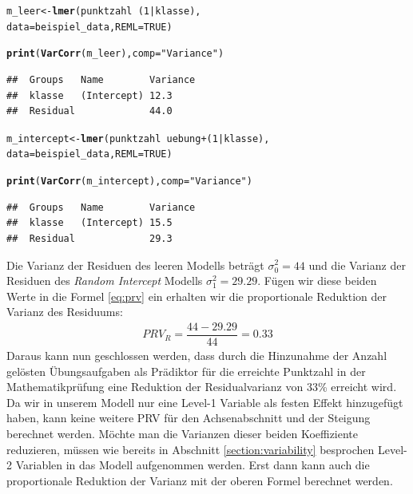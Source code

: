 \documentclass[12pt]{article}\usepackage[]{graphicx}\usepackage[]{color}
\makeatletter
\newcommand{\hlnum}[1]{\textcolor[rgb]{0.686,0.059,0.569}{#1}}%
\newcommand{\hlstr}[1]{\textcolor[rgb]{0.192,0.494,0.8}{#1}}%
\newcommand{\hlopt}[1]{\textcolor[rgb]{0,0,0}{#1}}%
\newcommand{\hlstd}[1]{\textcolor[rgb]{0.345,0.345,0.345}{#1}}%
\newcommand{\hlkwb}[1]{\textcolor[rgb]{0.69,0.353,0.396}{#1}}%
\newcommand{\hlkwc}[1]{\textcolor[rgb]{0.333,0.667,0.333}{#1}}%
\newcommand{\hlkwd}[1]{\textcolor[rgb]{0.737,0.353,0.396}{\textbf{#1}}}%
\newenvironment{kframe}{%
 \def\at@end@of@kframe{}%
 \ifinner\ifhmode%
  \def\at@end@of@kframe{\end{minipage}}%
  \begin{minipage}{\columnwidth}%
 \fi\fi%
 \def\FrameCommand##1{\hskip\@totalleftmargin \hskip-\fboxsep
 \colorbox{shadecolor}{##1}\hskip-\fboxsep
     \hskip-\linewidth \hskip-\@totalleftmargin \hskip\columnwidth}%
 \MakeFramed {\advance\hsize-\width
   \@totalleftmargin\z@ \linewidth\hsize
   \@setminipage}}%
 {\par\unskip\endMakeFramed%
 \at@end@of@kframe}
\newenvironment{knitrout}{}{} %
\makeatother
\begin{document}
\singlespacing
\begin{knitrout}
\color{fgcolor}\begin{kframe}
\begin{alltt}
\hlstd{m_leer} \hlkwb{<-} \hlkwd{lmer}\hlstd{(punktzahl} \hlopt{~} \hlstd{(}\hlnum{1} \hlopt{|} \hlstd{klasse),}
                \hlkwc{data} \hlstd{= beispiel_data,} \hlkwc{REML} \hlstd{=} \hlnum{TRUE}\hlstd{)}

\hlkwd{print}\hlstd{(}\hlkwd{VarCorr}\hlstd{(m_leer),} \hlkwc{comp} \hlstd{=} \hlstr{"Variance"}\hlstd{)}
\end{alltt}
\begin{verbatim}
##  Groups   Name        Variance
##  klasse   (Intercept) 12.3    
##  Residual             44.0
\end{verbatim}
\begin{alltt}
\hlstd{m_intercept} \hlkwb{<-} \hlkwd{lmer}\hlstd{(punktzahl} \hlopt{~} \hlstd{uebung} \hlopt{+} \hlstd{(}\hlnum{1} \hlopt{|} \hlstd{klasse),}
                \hlkwc{data} \hlstd{= beispiel_data,} \hlkwc{REML} \hlstd{=} \hlnum{TRUE}\hlstd{)}

\hlkwd{print}\hlstd{(}\hlkwd{VarCorr}\hlstd{(m_intercept),} \hlkwc{comp} \hlstd{=} \hlstr{"Variance"}\hlstd{)}
\end{alltt}
\begin{verbatim}
##  Groups   Name        Variance
##  klasse   (Intercept) 15.5    
##  Residual             29.3
\end{verbatim}
\end{kframe}
\end{knitrout}



Die Varianz der Residuen des leeren Modells beträgt $\sigma_{0}^2 = 44$ und die Varianz der Residuen des \textit{Random Intercept} Modells $\sigma_{1}^2 = 29.29$. Fügen wir diese beiden Werte in die Formel \eqref{eq:prv} ein erhalten wir die proportionale Reduktion der Varianz des Residuums:
\begin{equation} 
\begin{split}	
 PRV_{R} = \dfrac{44 - 29.29}{44} = 0.33
\end{split}	
\end{equation}
Daraus kann nun geschlossen werden, dass durch die Hinzunahme der Anzahl gelösten Übungsaufgaben als Prädiktor für die erreichte Punktzahl in der Mathematikprüfung eine Reduktion der Residualvarianz von 33\% erreicht wird. Da wir in unserem Modell nur eine Level-1 Variable als festen Effekt hinzugefügt haben, kann keine weitere PRV für den Achsenabschnitt und der Steigung berechnet werden. Möchte man die Varianzen dieser beiden Koeffiziente reduzieren, müssen wie bereits in Abschnitt \ref{section:variability} besprochen Level-2 Variablen in das Modell aufgenommen werden. Erst dann kann auch die proportionale Reduktion der Varianz mit der oberen Formel berechnet werden.
\end{document}
